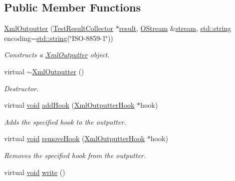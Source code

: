 \subsection*{Public Member Functions}
\begin{DoxyCompactItemize}
\item 
\hyperlink{class_xml_outputter_af98780d86b93b9eb2aa440c752d5ed6f}{Xml\-Outputter} (\hyperlink{class_test_result_collector}{Test\-Result\-Collector} $\ast$\hyperlink{glew_8h_a5fb5836a37f7607602a16ad733ed6357}{result}, \hyperlink{_stream_8h_a80291a4e32881b445c8d4f839a9dd979}{O\-Stream} \&\hyperlink{glew_8h_a10d3bc96cdfc1d478f52c13d5ffd9316}{stream}, \hyperlink{glew_8h_ae84541b4f3d8e1ea24ec0f466a8c568b}{std\-::string} encoding=\hyperlink{glew_8h_ae84541b4f3d8e1ea24ec0f466a8c568b}{std\-::string}(\char`\"{}I\-S\-O-\/8859-\/1\char`\"{}))
\begin{DoxyCompactList}\small\item\em Constructs a \hyperlink{class_xml_outputter}{Xml\-Outputter} object. \end{DoxyCompactList}\item 
virtual \hyperlink{class_xml_outputter_a159ce827427e235d8f2db9719acbba94}{$\sim$\-Xml\-Outputter} ()
\begin{DoxyCompactList}\small\item\em Destructor. \end{DoxyCompactList}\item 
virtual \hyperlink{wglew_8h_aeea6e3dfae3acf232096f57d2d57f084}{void} \hyperlink{class_xml_outputter_a5ecb9d974d3fbfe46324637462edb408}{add\-Hook} (\hyperlink{class_xml_outputter_hook}{Xml\-Outputter\-Hook} $\ast$hook)
\begin{DoxyCompactList}\small\item\em Adds the specified hook to the outputter. \end{DoxyCompactList}\item 
virtual \hyperlink{wglew_8h_aeea6e3dfae3acf232096f57d2d57f084}{void} \hyperlink{class_xml_outputter_ac4659712ab6b0f168119a22fbdb70255}{remove\-Hook} (\hyperlink{class_xml_outputter_hook}{Xml\-Outputter\-Hook} $\ast$hook)
\begin{DoxyCompactList}\small\item\em Removes the specified hook from the outputter. \end{DoxyCompactList}\item 
virtual \hyperlink{wglew_8h_aeea6e3dfae3acf232096f57d2d57f084}{void} \hyperlink{class_xml_outputter_a816f0010b840d445616c67152ac98d57}{write} ()

\end{DoxyCompactItemize}
